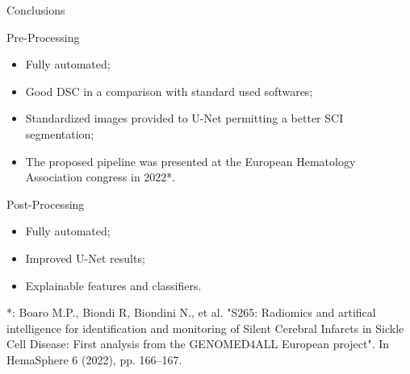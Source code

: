 \documentclass[]{standalone}
\begin{document}
	\begin{frame}{Conclusions}{}
	\vspace{-5pt}
	\begin{block}{Pre-Processing}
	\footnotesize
	\begin{itemize}
		\item Fully automated;
		\item Good DSC in a comparison with standard used softwares;
		\item Standardized images provided to U-Net permitting a better SCI segmentation;
		\item The proposed pipeline was presented at the European Hematology Association congress in 2022*.
	\end{itemize}
	\end{block}
	
	\begin{exampleblock}{Post-Processing}
	\footnotesize
	\begin{itemize}
		\item Fully automated;
		\item Improved U-Net results;
		\item Explainable features and classifiers.
	\end{itemize}
	\end{exampleblock}
	
	\vspace{5pt}
	\tiny
	*: Boaro M.P., Biondi R, Biondini N., et al. "S265: Radiomics and artifical intelligence for identification and monitoring of Silent Cerebral Infarcts in Sickle Cell Disease: First analysis from the GENOMED4ALL European project". In HemaSphere 6 (2022), pp. 166–167.
	\end{frame}
\end{document}

